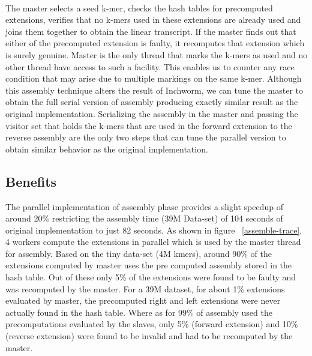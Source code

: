 \label{key}\documentclass[bachinf, english ,zihtitle,final,hyperref,utf8]{zihpub}
\begin{document}
\paragraph{}
The master selects a seed k-mer, checks the hash tables for precomputed extensions, verifies that no k-mers used in these extensions are already used and joins them together to obtain the linear transcript. If the master finds out that either of the precomputed extension is faulty, it recomputes that extension which is surely genuine. Master is the only thread that marks the k-mers as used and no other thread have access to such a facility. This enables us to counter any race condition that may arise due to multiple markings on the same k-mer. Although this assembly technique alters the result of Inchworm, we can tune the master to obtain the full serial version of assembly producing exactly similar result as the original implementation. Serializing the assembly in the master and passing the visitor set that holds the k-mers that are used in the forward extension to the reverse assembly are the only two steps that can tune the parallel version to obtain similar behavior as the original implementation.
\subsection{Benefits}
The parallel implementation of assembly phase provides a slight speedup of around 20\% restricting the assembly time (39M Data-set) of 104 seconds of original implementation to just 82 seconds. As shown in figure ~\ref{assemble-trace}, 4 workers compute the extensions in parallel which is used by the master thread for assembly. Based on the tiny data-set (4M kmers), around 90\% of the extensions computed by master uses the pre computed assembly stored in the hash table. Out of these only 5\% of the extensions were found to be faulty and was recomputed by the master.  For a 39M dataset, for about 1\% extensions evaluated by master, the precomputed right and left extensions were never actually found in the hash table. Where as for 99\% of assembly used the precomputations evaluated by the slaves, only  5\% (forward extension) and 10\%(reverse extension) were found to be invalid and had to be recomputed by the master. 
\end{document}
